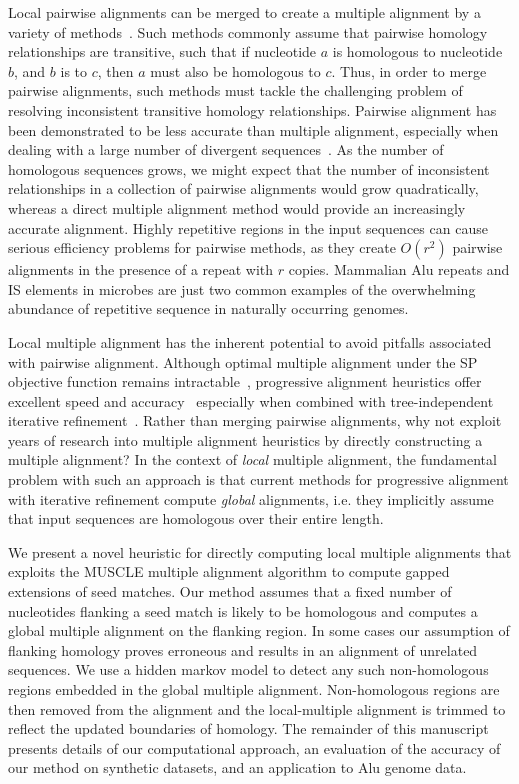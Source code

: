 \documentclass{ws-procs9x6}
\begin{document}
Local pairwise alignments can be merged to create a multiple alignment by a variety of methods~\cite{ref-tba,ref-aba,ref-dialign,ref-related1}. Such methods commonly assume that pairwise homology relationships are transitive, such that if nucleotide $a$ is homologous to nucleotide $b$, and $b$ is to $c$, then $a$ must also be homologous to $c$.  Thus, in order to merge pairwise alignments, such methods must tackle the challenging problem of resolving inconsistent transitive homology relationships.  Pairwise alignment has been demonstrated to be less accurate than multiple alignment, especially when dealing with a large number of divergent sequences~\cite{ref-mlagan,ref-aubergene}.  As the number of homologous sequences grows, we might expect that the number of inconsistent relationships in a collection of pairwise alignments would grow quadratically, whereas a direct multiple alignment method would provide an increasingly accurate alignment.  Highly repetitive regions in the input sequences can cause serious efficiency problems for pairwise methods, as they create $O(r^{2})$ pairwise alignments in the presence of a repeat with $r$ copies.  Mammalian Alu repeats and IS elements in microbes are just two common examples of the overwhelming abundance of repetitive sequence in naturally occurring genomes.

Local multiple alignment has the inherent potential to avoid pitfalls associated with pairwise alignment. Although optimal multiple alignment under the SP objective function remains intractable~\cite{ref-wangjiang}, progressive alignment heuristics offer excellent speed and accuracy~\cite{ref-clustalw, ref-tcoffee} especially when combined with tree-independent iterative refinement~\cite{ref-muscle}. Rather than merging pairwise alignments, why not exploit years of research into multiple alignment heuristics by directly constructing a multiple alignment?   In the context of \textit{local} multiple alignment, the fundamental problem with such an approach is that current methods for progressive alignment with iterative refinement compute \textit{global} alignments, i.e. they implicitly assume that input sequences are homologous over their entire length.

We present a novel heuristic for directly computing local multiple alignments that exploits the MUSCLE multiple alignment algorithm to compute gapped extensions of seed matches.  Our method assumes that a fixed number of nucleotides flanking a seed match is likely to be homologous and computes a global multiple alignment on the flanking region.  In some cases our assumption of flanking homology proves erroneous and results in an alignment of unrelated sequences.  We use a hidden markov model to detect any such non-homologous regions embedded in the global multiple alignment.  Non-homologous regions are then removed from the alignment and the local-multiple alignment is trimmed to reflect the updated boundaries of homology.  The remainder of this manuscript presents details of our computational approach, an evaluation of the accuracy of our method on synthetic datasets, and an application to Alu genome data.
\end{document}
